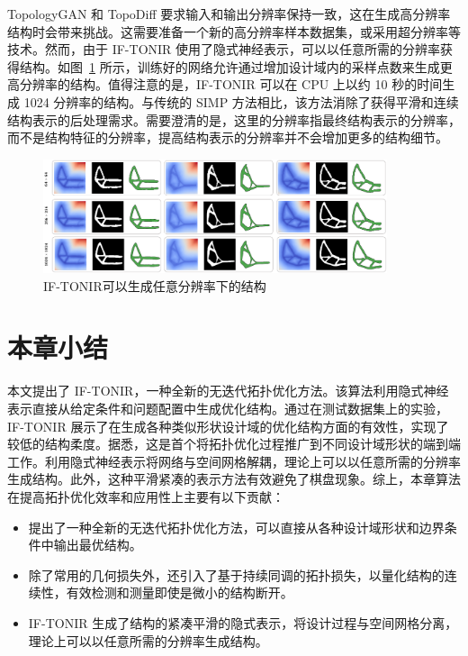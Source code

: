 TopologyGAN 和 TopoDiff 要求输入和输出分辨率保持一致，这在生成高分辨率结构时会带来挑战。这需要准备一个新的高分辨率样本数据集，或采用超分辨率等技术。然而，由于 IF-TONIR 使用了隐式神经表示，可以以任意所需的分辨率获得结构。如图~\ref{fig:resolution} 所示，训练好的网络允许通过增加设计域内的采样点数来生成更高分辨率的结构。值得注意的是，IF-TONIR 可以在 CPU 上以约 10 秒的时间生成 1024 分辨率的结构。与传统的 SIMP 方法相比，该方法消除了获得平滑和连续结构表示的后处理需求。需要澄清的是，这里的分辨率指最终结构表示的分辨率，而不是结构特征的分辨率，提高结构表示的分辨率并不会增加更多的结构细节。
\begin{figure}[!h]
    \centering
    \includegraphics[width=0.9\textwidth]{./figures/TONIR/fig-resolution.png}
    \caption{IF-TONIR可以生成任意分辨率下的结构}
    \label{fig:resolution}
\end{figure}

\section{本章小结}
本文提出了 IF-TONIR，一种全新的无迭代拓扑优化方法。该算法利用隐式神经表示直接从给定条件和问题配置中生成优化结构。通过在测试数据集上的实验，IF-TONIR 展示了在生成各种类似形状设计域的优化结构方面的有效性，实现了较低的结构柔度。据悉，这是首个将拓扑优化过程推广到不同设计域形状的端到端工作。利用隐式神经表示将网络与空间网格解耦，理论上可以以任意所需的分辨率生成结构。此外，这种平滑紧凑的表示方法有效避免了棋盘现象。综上，本章算法在提高拓扑优化效率和应用性上主要有以下贡献：
\begin{itemize}
    \item 提出了一种全新的无迭代拓扑优化方法，可以直接从各种设计域形状和边界条件中输出最优结构。
    \item 除了常用的几何损失外，还引入了基于持续同调的拓扑损失，以量化结构的连续性，有效检测和测量即使是微小的结构断开。
    \item IF-TONIR 生成了结构的紧凑平滑的隐式表示，将设计过程与空间网格分离，理论上可以以任意所需的分辨率生成结构。
\end{itemize}